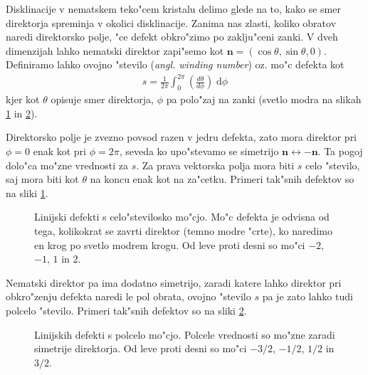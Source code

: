 \documentclass[12pt,twoside,openright,final]{report}
\renewcommand{\vec}{\mathbf}
\newcommand{\angl}[1]{(\textit{angl. #1})}
\newcommand{\dd}{\ensuremath{\;\mathrm{d}}}
\begin{document}
Disklinacije v nematskem teko"cem kristalu delimo glede na to, kako se smer direktorja spreminja v okolici disklinacije. 
Zanima nas zlasti, koliko obratov naredi direktorsko polje, "ce defekt obkro"zimo po zaklju"ceni zanki. 
V dveh dimenzijah lahko nematski direktor zapi"semo kot $\vec n = (\cos\theta, \sin\theta, 0)$. 
Definiramo lahko ovojno "stevilo \angl{winding number} oz. mo"c defekta kot
\begin{align}
\label{eq:winding-number}
 s = \frac{1}{2\pi}\int_0^{2\pi} \left(\frac{d\theta}{d\phi}\right) \dd \phi
\end{align}
kjer kot $\theta$ opisuje smer direktorja, $\phi$ pa polo"zaj na zanki (svetlo modra na slikah \ref{fig:defekti-celi} in \ref{fig:defekti-polceli}). 

Direktorsko polje je zvezno povsod razen v jedru defekta, zato mora direktor pri $\phi = 0$ enak kot pri $\phi = 2\pi$, seveda ko upo"stevamo se simetrijo $\vec n \leftrightarrow -\vec n$.
Ta pogoj dolo"ca mo"zne vrednosti za $s$. 
Za prava vektorska polja mora biti $s$ celo "stevilo, saj mora biti kot $\theta$ na koncu enak kot na za"cetku. 
Primeri tak"snih defektov so na sliki \ref{fig:defekti-celi}. 

\begin{figure}[h]
 \centering
 \caption{Linijski defekti s celo"stevilosko mo"cjo. Mo"c defekta je odvisna od tega, kolikokrat se zavrti direktor (temno modre "crte), ko naredimo en krog po svetlo modrem krogu. Od leve proti desni so mo"ci $-2$, $-1$, $1$ in $2$. }
 \label{fig:defekti-celi}
\end{figure}

Nematski direktor pa ima dodatno simetrijo, zaradi katere lahko direktor pri obkro"zenju defekta naredi le pol obrata, ovojno "stevilo $s$ pa je zato lahko tudi polcelo "stevilo. 
Primeri tak"snih defektov so na sliki \ref{fig:defekti-polceli}. 

\begin{figure}[h]
 \centering
 \caption{Linijskih defekti s polcelo mo"cjo. Polcele vrednosti so mo"zne zaradi simetrije direktorja. Od leve proti desni so mo"ci $-3/2$, $-1/2$, $1/2$ in $3/2$. }
 \label{fig:defekti-polceli}
\end{figure}
\end{document}
